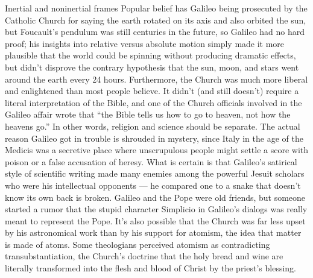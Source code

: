 \begin{envsubsection}{Inertial and noninertial frames}
Popular belief has Galileo being prosecuted
by the Catholic Church for saying the earth rotated on its axis and also orbited the sun, but
Foucault's pendulum was still centuries in the future, so Galileo had no hard
proof; his insights into relative versus absolute motion simply made it
more plausible that the world could be spinning without producing dramatic effects,
but didn't disprove the contrary hypothesis that the sun, moon, and
stars went around the earth every 24 hours. Furthermore, the Church was much more
liberal and enlightened than most people believe. It didn't (and still doesn't)
require a literal interpretation of the Bible, and one of the Church officials
involved in the Galileo affair wrote that ``the Bible tells us how to go to heaven,
not how the heavens go.'' In other words, religion and science should be separate.
The actual reason Galileo got in trouble is shrouded in mystery, since Italy in the
age of the Medicis was a secretive place where unscrupulous people might settle a score
with poison or a false accusation of heresy. What is certain is that Galileo's
satirical style of scientific writing made many enemies among the powerful Jesuit scholars
who were his intellectual opponents --- he compared one to a snake that doesn't know
its own back is broken. Galileo and the Pope were old friends, but someone started a rumor
that the stupid character Simplicio in Galileo's dialogs was really meant to represent the Pope.
It's also possible that the Church was far less upset by his
astronomical work than by his support for atomism, the idea that matter is made of atoms.
Some theologians perceived atomism
as contradicting transubstantiation, the Church's doctrine that
the holy bread and wine are literally transformed into the flesh and blood of
Christ by the priest's blessing.


\end{envsubsection}


